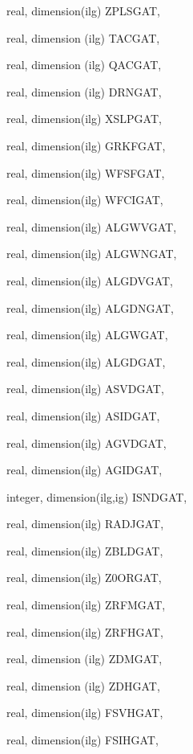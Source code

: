 {\begin{DoxyParamCaption}
\item[{real, dimension(ilg)}]{Z\+P\+L\+S\+G\+A\+T, }
\item[{real, dimension (ilg)}]{T\+A\+C\+G\+A\+T, }
\item[{real, dimension (ilg)}]{Q\+A\+C\+G\+A\+T, }
\item[{real, dimension (ilg)}]{D\+R\+N\+G\+A\+T, }
\item[{real, dimension(ilg)}]{X\+S\+L\+P\+G\+A\+T, }
\item[{real, dimension(ilg)}]{G\+R\+K\+F\+G\+A\+T, }
\item[{real, dimension(ilg)}]{W\+F\+S\+F\+G\+A\+T, }
\item[{real, dimension(ilg)}]{W\+F\+C\+I\+G\+A\+T, }
\item[{real, dimension(ilg)}]{A\+L\+G\+W\+V\+G\+A\+T, }
\item[{real, dimension(ilg)}]{A\+L\+G\+W\+N\+G\+A\+T, }
\item[{real, dimension(ilg)}]{A\+L\+G\+D\+V\+G\+A\+T, }
\item[{real, dimension(ilg)}]{A\+L\+G\+D\+N\+G\+A\+T, }
\item[{real, dimension(ilg)}]{A\+L\+G\+W\+G\+A\+T, }
\item[{real, dimension(ilg)}]{A\+L\+G\+D\+G\+A\+T, }
\item[{real, dimension(ilg)}]{A\+S\+V\+D\+G\+A\+T, }
\item[{real, dimension(ilg)}]{A\+S\+I\+D\+G\+A\+T, }
\item[{real, dimension(ilg)}]{A\+G\+V\+D\+G\+A\+T, }
\item[{real, dimension(ilg)}]{A\+G\+I\+D\+G\+A\+T, }
\item[{integer, dimension(ilg,ig)}]{I\+S\+N\+D\+G\+A\+T, }
\item[{real, dimension(ilg)}]{R\+A\+D\+J\+G\+A\+T, }
\item[{real, dimension(ilg)}]{Z\+B\+L\+D\+G\+A\+T, }
\item[{real, dimension(ilg)}]{Z0\+O\+R\+G\+A\+T, }
\item[{real, dimension(ilg)}]{Z\+R\+F\+M\+G\+A\+T, }
\item[{real, dimension(ilg)}]{Z\+R\+F\+H\+G\+A\+T, }
\item[{real, dimension (ilg)}]{Z\+D\+M\+G\+A\+T, }
\item[{real, dimension (ilg)}]{Z\+D\+H\+G\+A\+T, }
\item[{real, dimension(ilg)}]{F\+S\+V\+H\+G\+A\+T, }
\item[{real, dimension(ilg)}]{F\+S\+I\+H\+G\+A\+T, }

\end{DoxyParamCaption}}

